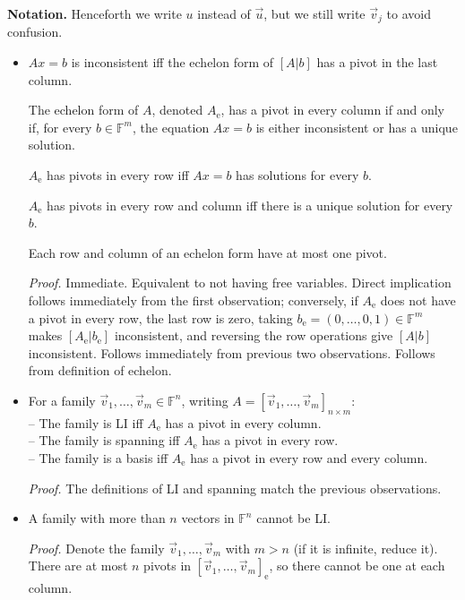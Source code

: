 \documentclass[11pt]{article}
\newcommand{\1}{\mathbf{1}}
\newcommand{\e}{{\mathrm{e}}}
\newcommand{\0}{\mathbf{0}}
\newcommand{\F}{\mathbb{F}}
\newcommand{\vu}{\vec{u}}
\newcommand{\vv}{\vec{v}}
\begin{document}
\textbf{Notation.} Henceforth we write $u$ instead of $\vu$, but we still write $\vv_j$ to avoid confusion.

\begin{itemize}

\item

$Ax  = b $ is inconsistent iff the echelon form of $[A|b]$ has a pivot in the last column.

The echelon form of $A$, denoted $A_\e$, has a pivot in every column if and only if, for every $b  \in \F^m$, the equation $Ax  = b $ is either inconsistent or has a unique solution.

$A_\e$ has pivots in every row iff
$Ax  = b $ has solutions for every $b$.

$A_\e$ has pivots in every row and column iff
there is a unique solution for every $b$.

Each row and column of an echelon form have at most one pivot.

\emph{Proof.}
Immediate.
Equivalent to not having free variables.
Direct implication follows immediately from the first observation; conversely, if $A_\e$ does not have a pivot in every row, the last row is zero, taking $b_\e = (0,\dots,0,1) \in \F^m$ makes $[A_\e|b_\e]$ inconsistent, and reversing the row operations give $[A|b]$ inconsistent.
Follows immediately from previous two observations.
Follows from definition of echelon.

\item

For a family $\vv_1,\dots,\vv_m \in \F^n$, writing $A=[\vv_1,\dots,\vv_m]_{n \times m}$:
\\ --
The family is LI iff $A_\e$ has a pivot in every column.
\\ --
The family is spanning iff $A_\e$ has a pivot in every row.
\\ --
The family is a basis iff $A_\e$ has a pivot in every row and every column.

\emph{Proof.}
The definitions of LI and spanning match the previous observations.

\item

A family with more than $n$ vectors in $\F^n$ cannot be LI.

\emph{Proof.}
Denote the family $\vv_1,\dots,\vv_m$ with $m>n$ (if it is infinite, reduce it).
There are at most $n$ pivots in $[\vv_1,\dots,\vv_m]_\e$, so there cannot be one at each column.


\end{itemize}
\end{document}
